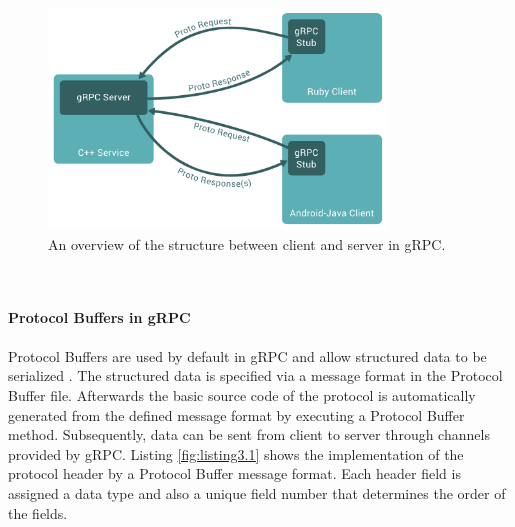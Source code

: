 \begin{figure}[tbp]
  \centering
  \includegraphics[width=0.8\textwidth]{images/grpc.png}
  \caption[gRPC Framework Structure]{An overview of the structure between client and server in gRPC.}
  \label{fig:gRPC_structure}
\end{figure}\\
\\
\textbf{Protocol Buffers in gRPC}
\\
\\
Protocol Buffers are used by default in gRPC and allow structured data to be serialized \cite{Proto}. %
The structured data is specified via a message format in the Protocol Buffer file. Afterwards the basic source code of the protocol is automatically generated from the defined message format by executing a Protocol Buffer method. Subsequently, data can be sent from client to server through channels provided by gRPC. Listing \ref{fig:listing3.1} shows the implementation of the protocol header by a Protocol Buffer message format. Each header field is assigned a data type and also a unique field number that determines the order of the fields.\\

